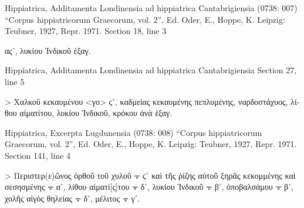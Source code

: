 \documentclass[12pt,letterpaper,twoside,final]{memoir}
\begin{document}
\begin{greek}
Hippiatrica, Additamenta Londinensia ad hippiatrica Cantabrigiensia (0738: 007)
“Corpus hippiatricorum Graecorum, vol. 2”, Ed. Oder, E., Hoppe, K.
Leipzig: Teubner, 1927, Repr. 1971.
Section 18, line 3

                                                   αςʹ, λυκίου 
Ἰνδικοῦ ἑξαγ. 



Hippiatrica, Additamenta Londinensia ad hippiatrica Cantabrigiensia 
Section 27, line 5

           > Χαλκοῦ κεκαυμένου <γο> ϛʹ, καδμείας κεκαυμένης 
πεπλυμένης, ναρδοστάχυος, λίθου αἱματίτου, λυκίου Ἰνδικοῦ, 
κρόκου ἀνὰ ἑξαγ. 



Hippiatrica, Excerpta Lugdunensia (0738: 008)
“Corpus hippiatricorum Graecorum, vol. 2”, Ed. Oder, E., Hoppe, K.
Leipzig: Teubner, 1927, Repr. 1971.
Section 141, line 4

                                   > Περιστερ(ε)ῶνος ὀρθοῦ 
τοῦ χυλοῦ 𐆆 ϛʹ καὶ τῆς ῥίζης αὐτοῦ ξηρᾶς κεκομμένης καὶ 
σεσησμένης 𐆆 αʹ, λίθου αἱματί[ς]του 𐆆 δʹ, λυκίου Ἰνδικοῦ 
𐆆 βʹ, ὀποβαλσάμου 𐆆 βʹ, χολῆς αἰγὸς θηλείας 𐆆 δʹ, μέλιτος 
𐆆 γʹ. 



\end{greek}
\end{document}
